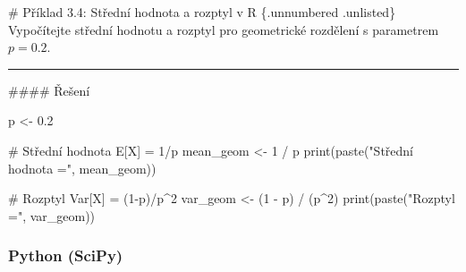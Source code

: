 \documentclass[
  czech,
  11pt,
  letterpaper,
  DIV=11,
  numbers=noendperiod]{scrreprt}
\newenvironment{Shaded}{\begin{snugshade}}{\end{snugshade}}
\newcommand{\CommentTok}[1]{\textcolor[rgb]{0.37,0.37,0.37}{#1}}
\newcommand{\DecValTok}[1]{\textcolor[rgb]{0.68,0.00,0.00}{#1}}
\newcommand{\FloatTok}[1]{\textcolor[rgb]{0.68,0.00,0.00}{#1}}
\newcommand{\FunctionTok}[1]{\textcolor[rgb]{0.28,0.35,0.67}{#1}}
\newcommand{\NormalTok}[1]{\textcolor[rgb]{0.00,0.23,0.31}{#1}}
\newcommand{\OtherTok}[1]{\textcolor[rgb]{0.00,0.23,0.31}{#1}}
\newcommand{\SpecialCharTok}[1]{\textcolor[rgb]{0.37,0.37,0.37}{#1}}
\newcommand{\StringTok}[1]{\textcolor[rgb]{0.13,0.47,0.30}{#1}}
\begin{document}
\begin{tcolorbox}[enhanced jigsaw, arc=.35mm, bottomrule=.15mm, bottomtitle=1mm, breakable, colback=white, colbacktitle=quarto-callout-note-color!10!white, colframe=quarto-callout-note-color-frame, coltitle=black, left=2mm, leftrule=.75mm, opacityback=0, opacitybacktitle=0.6, rightrule=.15mm, title=\textcolor{quarto-callout-note-color}{\faInfo}\hspace{0.5em}{Poznámka}, titlerule=0mm, toprule=.15mm, toptitle=1mm]

\# Příklad 3.4: Střední hodnota a rozptyl v R \{.unnumbered .unlisted\}
Vypočítejte střední hodnotu a rozptyl pro geometrické rozdělení s
parametrem \(p=0.2\).

\begin{center}\rule{0.5\linewidth}{0.5pt}\end{center}

\#\#\#\# Řešení

\begin{Shaded}
\begin{Highlighting}[]
\NormalTok{p }\OtherTok{\textless{}{-}} \FloatTok{0.2}

\CommentTok{\# Střední hodnota E[X] = 1/p}
\NormalTok{mean\_geom }\OtherTok{\textless{}{-}} \DecValTok{1} \SpecialCharTok{/}\NormalTok{ p}
\FunctionTok{print}\NormalTok{(}\FunctionTok{paste}\NormalTok{(}\StringTok{"Střední hodnota ="}\NormalTok{, mean\_geom))}

\CommentTok{\# Rozptyl Var[X] = (1{-}p)/p\^{}2}
\NormalTok{var\_geom }\OtherTok{\textless{}{-}}\NormalTok{ (}\DecValTok{1} \SpecialCharTok{{-}}\NormalTok{ p) }\SpecialCharTok{/}\NormalTok{ (p}\SpecialCharTok{\^{}}\DecValTok{2}\NormalTok{)}
\FunctionTok{print}\NormalTok{(}\FunctionTok{paste}\NormalTok{(}\StringTok{"Rozptyl ="}\NormalTok{, var\_geom))}
\end{Highlighting}
\end{Shaded}

\end{tcolorbox}

\subsubsection*{Python (SciPy)}\label{python-scipy-2}
\end{document}

